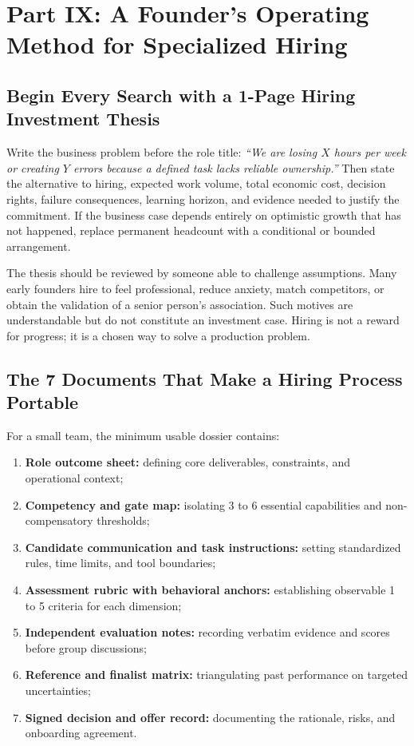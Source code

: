 \section*{Part IX: A Founder's Operating Method for Specialized Hiring}

\subsection{Begin Every Search with a 1-Page Hiring Investment Thesis}
\label{sec:hiring_investment_thesis}

Write the business problem before the role title: \textit{``We are losing $X$ hours per week or creating $Y$ errors because a defined task lacks reliable ownership.''} Then state the alternative to hiring, expected work volume, total economic cost, decision rights, failure consequences, learning horizon, and evidence needed to justify the commitment. If the business case depends entirely on optimistic growth that has not happened, replace permanent headcount with a conditional or bounded arrangement.

The thesis should be reviewed by someone able to challenge assumptions. Many early founders hire to feel professional, reduce anxiety, match competitors, or obtain the validation of a senior person's association. Such motives are understandable but do not constitute an investment case. Hiring is not a reward for progress; it is a chosen way to solve a production problem.

\subsection{The 7 Documents That Make a Hiring Process Portable}
\label{sec:seven_documents}

For a small team, the minimum usable dossier contains:
\begin{enumerate}
    \item \textbf{Role outcome sheet:} defining core deliverables, constraints, and operational context;
    \item \textbf{Competency and gate map:} isolating 3 to 6 essential capabilities and non-compensatory thresholds;
    \item \textbf{Candidate communication and task instructions:} setting standardized rules, time limits, and tool boundaries;
    \item \textbf{Assessment rubric with behavioral anchors:} establishing observable 1 to 5 criteria for each dimension;
    \item \textbf{Independent evaluation notes:} recording verbatim evidence and scores before group discussions;
    \item \textbf{Reference and finalist matrix:} triangulating past performance on targeted uncertainties;
    \item \textbf{Signed decision and offer record:} documenting the rationale, risks, and onboarding agreement.
\end{enumerate}

